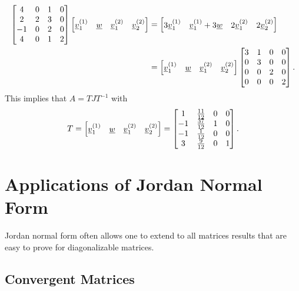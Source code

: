\begin{example}
\begin{align*}
\begin{bmatrix} 4 & 0 & 1 & 0 \\ 2 & 2 & 3 & 0 \\ -1 & 0 & 2 & 0 \\ 4 & 0 & 1 & 2 \end{bmatrix}
\begin{bmatrix} \underline{v}_1^{(1)} & \underline{w} & \underline{v}_1^{(2)} & \underline{v}_2^{(2)} \end{bmatrix}
& = \begin{bmatrix} 3 \underline{v}_1^{(1)} & \underline{v}_1^{(1)}+3 \underline{w} & 2 \underline{v}_1^{(2)} & 2 \underline{v}_2^{(2)} \end{bmatrix} \\
&= \begin{bmatrix} \underline{v}_1^{(1)} & \underline{w} & \underline{v}_1^{(2)} & \underline{v}_2^{(2)} \end{bmatrix}
\begin{bmatrix} 3 & 1 & 0 & 0 \\ 0 & 3 & 0 & 0 \\ 0 & 0 & 2 & 0 \\ 0 & 0 & 0 & 2 \end{bmatrix} .
\end{align*}
This implies that $A = T J T^{-1}$ with
\begin{equation*}
T = \begin{bmatrix} \underline{v}_1^{(1)} & \underline{w} & \underline{v}_1^{(2)} & \underline{v}_2^{(2)} \end{bmatrix}
 = \begin{bmatrix} 1 & \frac{11}{12} & 0 & 0 \\ -1 & \frac{37}{12} & 1 & 0 \\ -1 & \frac{1}{12} & 0 & 0 \\ 3 & \frac{9}{12} & 0 & 1 \end{bmatrix} .
\end{equation*}
\end{example}


\section{Applications of Jordan Normal Form}

Jordan normal form often allows one to extend to all matrices results that are easy to prove for diagonalizable matrices.

\subsection{Convergent Matrices}

